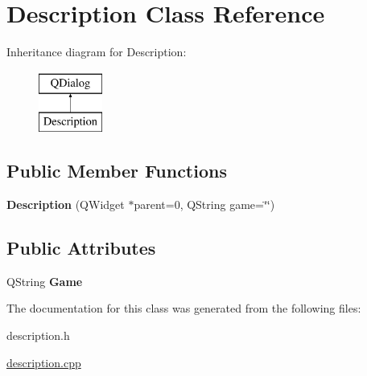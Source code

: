 \hypertarget{classDescription}{\section{Description Class Reference}
\label{classDescription}
}
Inheritance diagram for Description\-:\begin{figure}[H]
\begin{center}
\leavevmode
\includegraphics[height=2.000000cm]{classDescription}
\end{center}
\end{figure}
\subsection*{Public Member Functions}
\begin{DoxyCompactItemize}
\item 
\hypertarget{classDescription_aff75945f12c14cffd410cf456ddbfb27}{{\bfseries Description} (Q\-Widget $\ast$parent=0, Q\-String game=\char`\"{}\char`\"{})}\label{classDescription_aff75945f12c14cffd410cf456ddbfb27}

\end{DoxyCompactItemize}
\subsection*{Public Attributes}
\begin{DoxyCompactItemize}
\item 
\hypertarget{classDescription_a540e784e9116b5060c4573d37f4e6157}{Q\-String {\bfseries Game}}\label{classDescription_a540e784e9116b5060c4573d37f4e6157}

\end{DoxyCompactItemize}


The documentation for this class was generated from the following files\-:\begin{DoxyCompactItemize}
\item 
description.\-h\item 
\hyperlink{description_8cpp}{description.\-cpp}\end{DoxyCompactItemize}
